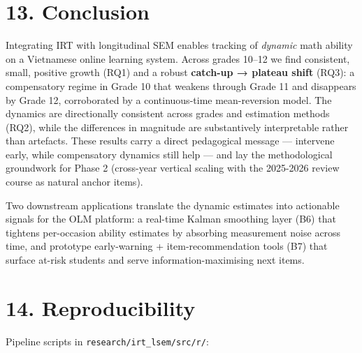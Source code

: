 \documentclass[
]{article}
\begin{document}
\hypertarget{conclusion}{%
\section{13. Conclusion}\label{conclusion}}

Integrating IRT with longitudinal SEM enables tracking of \emph{dynamic}
math ability on a Vietnamese online learning system. Across grades
10--12 we find consistent, small, positive growth (RQ1) and a robust
\textbf{catch-up → plateau shift} (RQ3): a compensatory regime in Grade
10 that weakens through Grade 11 and disappears by Grade 12,
corroborated by a continuous-time mean-reversion model. The dynamics are
directionally consistent across grades and estimation methods (RQ2),
while the differences in magnitude are substantively interpretable
rather than artefacts. These results carry a direct pedagogical message
--- intervene early, while compensatory dynamics still help --- and lay
the methodological groundwork for Phase 2 (cross-year vertical scaling
with the 2025-2026 review course as natural anchor items).

Two downstream applications translate the dynamic estimates into
actionable signals for the OLM platform: a real-time Kalman smoothing
layer (B6) that tightens per-occasion ability estimates by absorbing
measurement noise across time, and prototype early-warning +
item-recommendation tools (B7) that surface at-risk students and serve
information-maximising next items.

\hypertarget{reproducibility}{%
\section{14. Reproducibility}\label{reproducibility}}

Pipeline scripts in \texttt{research/irt\_lsem/src/r/}:
\end{document}
